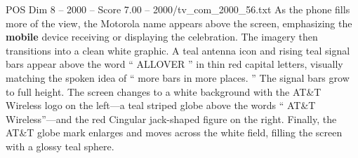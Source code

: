 \begin{textsample}{POS Dim 8 – 2000 – Score 7.00 – 2000/tv\_com\_2000\_56.txt}
As the phone fills more of the view, the Motorola name appears above the screen, emphasizing the \textbf{mobile} device receiving or displaying the celebration.
The imagery then transitions into a clean white graphic.
A teal antenna icon and rising teal signal bars appear above the word “ ALLOVER ” in thin red capital letters, visually matching the spoken idea of “ more bars in more places. ” The signal bars grow to full height.
The screen changes to a white background with the AT\&T Wireless logo on the left—a teal striped globe above the words “ AT\&T Wireless”—and the red Cingular jack-shaped figure on the right.
Finally, the AT\&T globe mark enlarges and moves across the white field, filling the screen with a glossy teal sphere.

\end{textsample}
